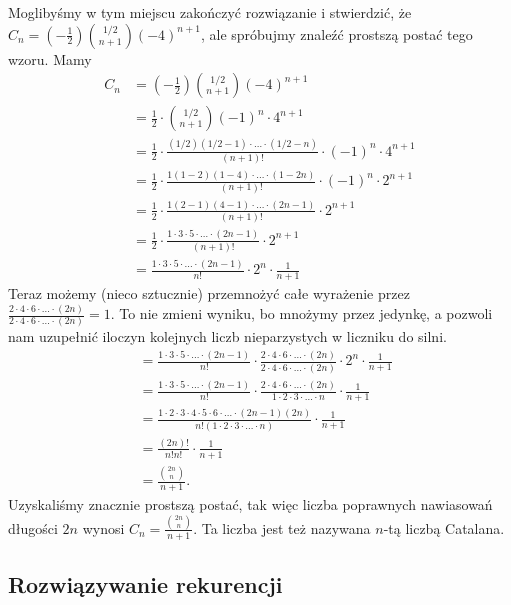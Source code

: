 \documentclass[shortabstract]{imthesis}
\begin{document}
    Moglibyśmy w tym miejscu zakończyć rozwiązanie i stwierdzić, że $C_n = \left(-\frac12\right){1/2 \choose n+1} (-4)^{n+1}$, ale spróbujmy znaleźć prostszą postać tego wzoru. Mamy
    \begin{align*}
    C_n &= \left(-\frac12\right){1/2 \choose n+1} (-4)^{n+1} \\
    &= \frac12 \cdot {1/2 \choose n+1} (-1)^n \cdot 4^{n+1} \\
    &= \frac12 \cdot \frac{(1/2)(1/2-1)\cdot\ldots\cdot(1/2-n)}{(n+1)!} \cdot (-1)^n \cdot 4^{n+1} \\
    &= \frac12 \cdot \frac{1(1-2)(1-4)\cdot\ldots\cdot(1-2n)}{(n+1)!} \cdot (-1)^n \cdot 2^{n+1} \\
    &= \frac12 \cdot \frac{1(2-1)(4-1)\cdot\ldots\cdot(2n-1)}{(n+1)!} \cdot 2^{n+1} \\
    &= \frac12 \cdot \frac{1\cdot3\cdot5\cdot\ldots\cdot(2n-1)}{(n+1)!} \cdot 2^{n+1} \\
    &= \frac{1\cdot3\cdot5\cdot\ldots\cdot(2n-1)}{n!} \cdot 2^n \cdot \frac{1}{n+1}
    \end{align*}
    Teraz możemy (nieco sztucznie) przemnożyć całe wyrażenie przez $\frac{2\cdot4\cdot6\cdot\ldots\cdot(2n)}{2\cdot4\cdot6\cdot\ldots\cdot(2n)} = 1$. To nie zmieni wyniku, bo mnożymy przez jedynkę, a pozwoli nam uzupełnić iloczyn kolejnych liczb nieparzystych w liczniku do silni.
    \begin{align*}
    &= \frac{1\cdot3\cdot5\cdot\ldots\cdot(2n-1)}{n!} \cdot \frac{2\cdot4\cdot6\cdot\ldots\cdot(2n)}{2\cdot4\cdot6\cdot\ldots\cdot(2n)} \cdot 2^n \cdot \frac{1}{n+1}\\
    &= \frac{1\cdot3\cdot5\cdot\ldots\cdot(2n-1)}{n!} \cdot \frac{2\cdot4\cdot6\cdot\ldots\cdot(2n)}{1\cdot2\cdot3\cdot\ldots\cdot n} \cdot \frac{1}{n+1}\\
    &= \frac{1\cdot2\cdot3\cdot4\cdot5\cdot6\cdot\ldots\cdot(2n-1)(2n)}{n!(1\cdot2\cdot3\cdot\ldots\cdot n)} \cdot \frac{1}{n+1}\\
    &= \frac{(2n)!}{n!n!} \cdot \frac{1}{n+1}\\
    &= \frac{{2n \choose n}}{n+1}.
    \end{align*}
    Uzyskaliśmy znacznie prostszą postać, tak więc liczba poprawnych nawiasowań długości $2n$ wynosi $C_n = \frac{{2n \choose n}}{n+1}$. Ta liczba jest też nazywana $n$-tą liczbą Catalana.

\subsection{Rozwiązywanie rekurencji}
\end{document}
